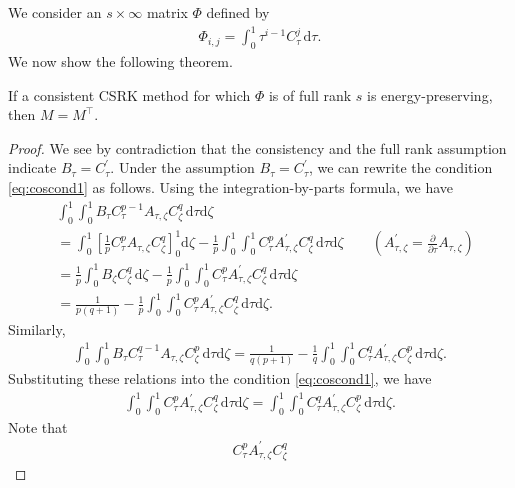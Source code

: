 \documentclass[final,leqno,onefignum,onetabnum]{siamltex1213}
\begin{document}
We consider an $s\times \infty$ matrix $\Phi $ defined by
\begin{align*}
\Phi_{i,j} = \int _0^1 \tau^{i-1} C_\tau^j\,{\mathrm d} \tau.
\end{align*}
We now show the following theorem.
\begin{theorem}\label{maintheorem}
If a consistent CSRK method for which $\Phi$ is of full rank $s$
is energy-preserving,
then $M=M^\top$.
\end{theorem}

\begin{proof}
We see by contradiction that
the consistency and the full rank assumption indicate $B_\tau = C_\tau^\prime$.
Under the assumption $B_\tau = C_\tau^\prime$,
we can rewrite the condition \eqref{eq:coscond1} as follows.
Using the integration-by-parts formula, we have
\begin{align*}
&\int_0^1 \int_0^1 B_\tau C_\tau ^{p-1} A_{\tau,\zeta} C_\zeta^q \, {\mathrm d} \tau {\mathrm d} \zeta \\
&= 
\int _0^1 \left[ \frac{1}{p} C_\tau ^{p} A_{\tau,\zeta} C_\zeta^q \right]_0^1
{\mathrm d} \zeta
-
\frac{1}{p} \int_0^1 \int_0^1 C_\tau^p A_{\tau,\zeta}^\prime C_\zeta^q \, 
{\mathrm d}\tau{\mathrm d}\zeta \qquad (A_{\tau,\zeta} ^\prime = \frac{\partial}{\partial \tau} A_{\tau,\zeta}) \\
&=
\frac{1}{p} \int _0^1 B_\zeta C_\zeta^q \,{\mathrm d} \zeta -
\frac{1}{p} \int_0^1 \int_0^1 C_\tau^p A_{\tau,\zeta}^\prime C_\zeta^q \, {\mathrm d}\tau{\mathrm d}\zeta \\
&= 
\frac{1}{p(q+1)} - \frac{1}{p} \int_0^1 \int_0^1 C_\tau^p
A_{\tau,\zeta}^\prime C_\zeta^q \, {\mathrm d}\tau{\mathrm d}\zeta .
\end{align*}
Similarly,
\begin{align*}
\int_0^1 \int_0^1 B_\tau C_\tau ^{q-1} A_{\tau,\zeta} C_\zeta^p \, {\mathrm d} \tau {\mathrm d} \zeta
=
\frac{1}{q(p+1)} - \frac{1}{q} \int_0^1 \int_0^1 C_\tau^q
A_{\tau,\zeta}^\prime C_\zeta^p \, {\mathrm d}\tau{\mathrm d}\zeta .
\end{align*}
Substituting these relations into the condition \eqref{eq:coscond1},
we have
\begin{align*}
\int_0^1 \int_0^1 C_\tau^p A_{\tau,\zeta}^\prime C_\zeta^q \,{\mathrm d}\tau{\mathrm d}\zeta
=
\int_0^1 \int_0^1 C_\tau^q A_{\tau,\zeta}^\prime C_\zeta^p \,{\mathrm d}\tau{\mathrm d}\zeta .
\end{align*}
Note that
\begin{align*}
C_\tau^p A_{\tau,\zeta}^\prime C_\zeta^q 

\end{align*}
\end{proof}
\end{document}

